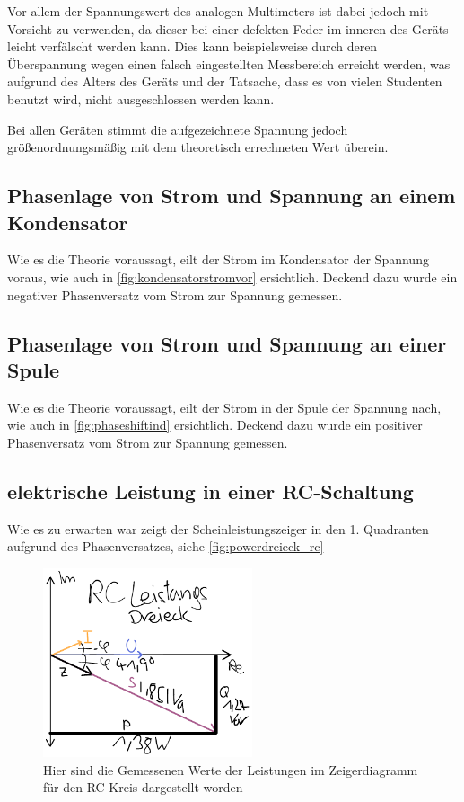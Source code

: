 \documentclass[11pt,ngerman]{scrartcl}
\begin{document}
Vor allem der Spannungswert des analogen Multimeters ist dabei jedoch mit Vorsicht zu verwenden, da dieser bei einer defekten Feder im inneren des Geräts leicht verfälscht werden kann. Dies kann beispielsweise durch deren Überspannung wegen einen falsch eingestellten Messbereich erreicht werden, was aufgrund des Alters des Geräts und der Tatsache, dass es von vielen Studenten benutzt wird, nicht ausgeschlossen werden kann.

\vspace{2mm}

Bei allen Geräten stimmt die aufgezeichnete Spannung jedoch größenordnungsmäßig mit dem theoretisch errechneten Wert überein.



\subsection{Phasenlage von Strom und Spannung an einem Kondensator}

Wie es die Theorie voraussagt, eilt der Strom im Kondensator der Spannung voraus, wie auch in \autoref{fig:kondensatorstromvor} ersichtlich.
Deckend dazu wurde ein negativer Phasenversatz vom Strom zur Spannung gemessen.


\subsection{Phasenlage von Strom und Spannung an einer Spule}

Wie es die Theorie voraussagt, eilt der Strom in der Spule der Spannung nach, wie auch in \autoref{fig:phaseshiftind} ersichtlich.
Deckend dazu wurde ein positiver Phasenversatz vom Strom zur Spannung gemessen.


\subsection{elektrische Leistung in einer RC-Schaltung}

Wie es zu erwarten war zeigt der Scheinleistungszeiger in den 1. Quadranten
aufgrund des Phasenversatzes, siehe \autoref{fig:powerdreieck_rc}

\begin{figure}[H]
	\begin{center}
		\includegraphics[width=0.55\textwidth]{./figures/rc_zeiger.pdf}
	\end{center}
	\caption{Hier sind die Gemessenen Werte der Leistungen im Zeigerdiagramm für den RC Kreis dargestellt worden}
	\label{fig:powerdreieck_rc}
\end{figure}
\end{document}

